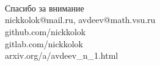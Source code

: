 \documentclass[10pt,pdf,hyperref={unicode},aspectratio=169]{beamer}
\theoremstyle{definition}
\begin{document}

\begin{frame}
	{
		\huge\centering
		~\\~\\~\\
		Спасибо за внимание
	}
	~\\
	\vspace{6.28em}
	nickkolok@mail.ru, avdeev@math.vsu.ru
	\\
	github.com/nickkolok
	\\
	gitlab.com/nickkolok
	\\
	arxiv.org/a/avdeev\_n\_1.html
\end{frame}
\end{document}
